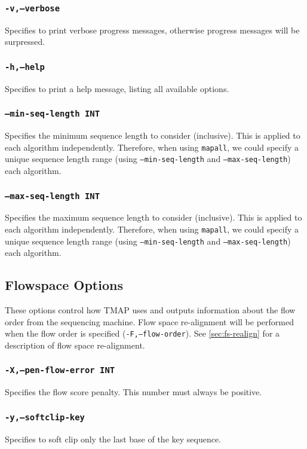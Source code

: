 \documentclass[a4paper,12pt]{book}
\newcommand{\TT}[1]{{\tt #1}} %
\begin{document}
\subsubsection{\TT{-v,--verbose}}
Specifies to print verbose progress messages, otherwise progress messages will be surpressed.

\subsubsection{\TT{-h,--help}}
Specifies to print a help message, listing all available options.

\subsubsection{\TT{--min-seq-length INT}}
Specifies the minimum sequence length to consider (inclusive).
This is applied to each algorithm independently.
Therefore, when using \TT{mapall}, we could specify a unique sequence length range (using \TT{---min-seq-length} and \TT{---max-seq-length}) each algorithm.

\subsubsection{\TT{--max-seq-length INT}}
Specifies the maximum sequence length to consider (inclusive).
This is applied to each algorithm independently.
Therefore, when using \TT{mapall}, we could specify a unique sequence length range (using \TT{---min-seq-length} and \TT{---max-seq-length}) each algorithm.

\subsection{Flowspace Options}
These options control how TMAP uses and outputs information about the flow order from the sequencing machine.
Flow space re-alignment will be performed when the flow order is specified (\TT{-F,--flow-order}).
See \autoref{sec:fs-realign} for a description of flow space re-alignment.

\subsubsection{\TT{-X,--pen-flow-error INT}}
Specifies the flow score penalty.
This number must always be positive.

\subsubsection{\TT{-y,--softclip-key}}
Specifies to soft clip only the last base of the key sequence.
\end{document}
